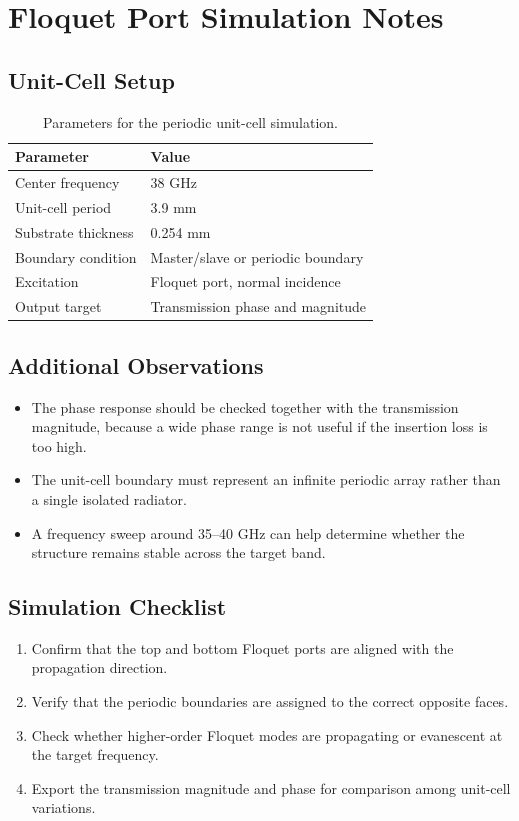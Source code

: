 \documentclass[10pt]{article}
\begin{document}
\section{Floquet Port Simulation Notes}

\subsection{Unit-Cell Setup}
\begin{table}[H]
    \centering
    \caption{Parameters for the periodic unit-cell simulation.}
    \begin{tabular}{ll}
        \hline
        \textbf{Parameter} & \textbf{Value} \\
        \hline
        Center frequency & 38 GHz \\
        Unit-cell period & 3.9 mm \\
        Substrate thickness & 0.254 mm \\
        Boundary condition & Master/slave or periodic boundary \\
        Excitation & Floquet port, normal incidence \\
        Output target & Transmission phase and magnitude \\
        \hline
    \end{tabular}
\end{table}

\subsection{Additional Observations}
\begin{itemize}
    \item The phase response should be checked together with the transmission magnitude, because a wide phase range is not useful if the insertion loss is too high.
    \item The unit-cell boundary must represent an infinite periodic array rather than a single isolated radiator.
    \item A frequency sweep around 35--40 GHz can help determine whether the structure remains stable across the target band.
\end{itemize}

\subsection{Simulation Checklist}
\begin{enumerate}
    \item Confirm that the top and bottom Floquet ports are aligned with the propagation direction.
    \item Verify that the periodic boundaries are assigned to the correct opposite faces.
    \item Check whether higher-order Floquet modes are propagating or evanescent at the target frequency.
    \item Export the transmission magnitude and phase for comparison among unit-cell variations.
\end{enumerate}
\end{document}
